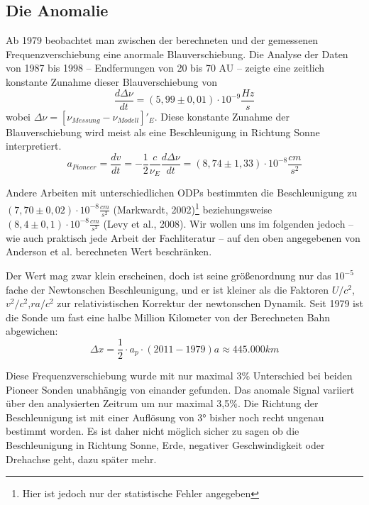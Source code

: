\documentclass[a4paper,10pt]{article}
\newcommand{\rem}[1]{}
\begin{document}
\subsection{Die Anomalie}
Ab 1979 beobachtet man zwischen der berechneten und der gemessenen Frequenzverschiebung eine anormale Blauverschiebung.
Die Analyse der Daten von 1987 bis 1998 – Endfernungen von 20 bis 70 AU – zeigte eine zeitlich konstante Zunahme dieser Blauverschiebung von
\begin{equation}
  \frac{d\Delta\nu}{dt}=(5,99\pm0,01)\cdot10^{-9}\frac{Hz}{s}
\end{equation}
wobei $\Delta\nu=[\nu_{Messung}-\nu_{Modell}]'_E$. Diese konstante Zunahme der Blauverschiebung wird meist als eine
Beschleunigung in Richtung Sonne interpretiert.
\begin{equation}
  a_{Pioneer}=\frac{dv}{dt}=-\frac{1}{2}\frac{c}{\nu_E}\frac{d\Delta\nu}{dt} = (8,74\pm1,33)\cdot10^{-8}\frac{cm}{s^2}
\end{equation}
\rem{
oder
\begin{equation}
  \Delta\nu=-\nu_E \frac{2a_p t}{c}
\end{equation}
}
Andere Arbeiten mit unterschiedlichen ODPs bestimmten die Beschleunigung zu $(7,70
\pm0,02)\cdot10^{-8}\frac{cm}{s^2}$ (Markwardt,
2002)\footnote{Hier ist jedoch nur der statistische Fehler angegeben}\cite{Markwardt2002} beziehungsweise
$(8,4\pm0,1)\cdot10^{-8}\frac{cm}{s^2}$ (Levy et al., 2008)\cite{Levy2008}.
Wir wollen uns im folgenden jedoch – wie auch praktisch jede Arbeit der Fachliteratur – auf den oben angegebenen von
Anderson et al. berechneten Wert beschränken.

Der Wert mag zwar klein erscheinen, doch ist seine größenordnung nur das $10^{-5}$ fache der Newtonschen Beschleunigung,
und er ist kleiner als die Faktoren $U/c^2$,$v^2/c^2$,$r a/c^2$ zur relativistischen Korrektur der newtonschen Dynamik. %
Seit 1979 ist die Sonde um fast eine halbe Million Kilometer von der Berechneten Bahn abgewichen:
\begin{equation}
  \Delta x= \frac12 \cdot a_p \cdot (2011-1979) a\approx 445.000 km
\end{equation}

Diese Frequenzverschiebung wurde mit nur maximal 3\% Unterschied bei beiden Pioneer Sonden unabhängig von einander
gefunden. Das anomale Signal variiert über den analysierten Zeitrum um nur maximal 3,5\%. Die Richtung der
Beschleunigung ist mit einer Auflösung von 3° bisher noch recht ungenau bestimmt worden. Es ist daher nicht möglich sicher zu sagen ob die Beschleunigung
in Richtung Sonne, Erde, negativer Geschwindigkeit oder Drehachse geht, dazu später mehr.
\end{document}
